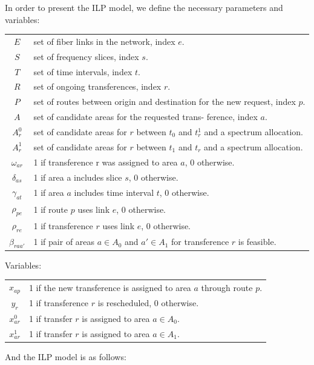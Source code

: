 \documentclass[11pt,a4paper]{article}
\begin{document}
In order to present the ILP model, we define the necessary parameters and variables:
\begin{table}[H]
\small
\begin{tabular}{c l}
$E$ & set of fiber links in the network, index $e$.\\
$S$ &  set of frequency slices, index $s$.\\
$T$ & set of time intervals, index $t$.\\
$R$ & set of ongoing transferences, index $r$.\\
$P$ & set of routes between origin and destination for the new request, index $p$.\\
$A$ & set of candidate areas for the requested trans- ference, index $a$.\\
$A^{0}_{r}$ & set of candidate areas for $r$ between $t_{0}$ and $t^{1}_{r}$ and a spectrum allocation.\\
$A^{1}_{r}$ & set of candidate areas for $r$ between $t_{1}$ and $t_{r}$ and a spectrum allocation.\\
$\omega_{ar}$ & 1 if transference r was assigned to area $a$, 0 otherwise.\\
$\delta_{as}$ & 1 if area a includes slice $s$, 0 otherwise.\\
$\gamma_{at}$ & 1 if area $a$ includes time interval $t$, 0 otherwise.\\ 
$\rho_{pe}$ & 1 if route $p$ uses link $e$, 0 otherwise.\\
$\rho_{re}$ & 1 if transference $r$ uses link $e$, 0 otherwise.\\
$\beta_{raa'}$ & 1 if pair of areas $a \in A_{0}$ and $a' \in A_{1}$ for transference $r$ is feasible.\\
\end{tabular}
\end{table}
Variables:
\begin{table}[H]
\small
\begin{tabular}{c l}
$x_{ap}$ & 1 if the new transference is assigned to area $a$ through route $p$.\\
$y_{r}$ & 1 if transference $r$ is rescheduled, 0 otherwise.\\
$x^{0}_{ar}$ & 1 if transfer $r$ is assigned to area $a \in A_{0}$.\\
$x^{1}_{ar}$ & 1 if transfer $r$ is assigned to area $a \in A_{1}$.\\
\end{tabular}
\end{table}
And the ILP model is as follows:\\
\end{document}
